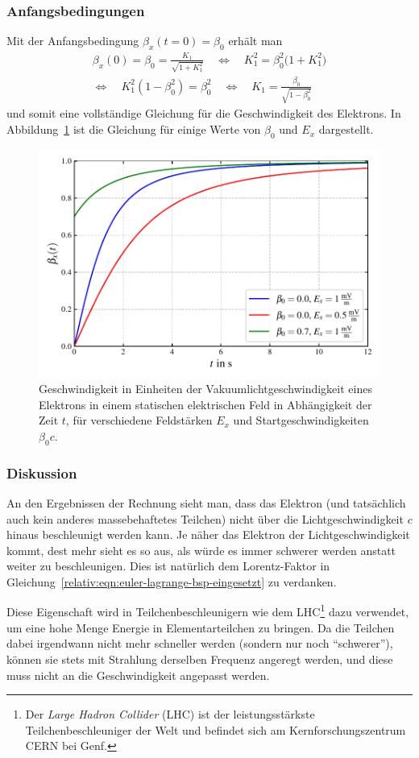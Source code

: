 \subsubsection{Anfangsbedingungen}
Mit der Anfangsbedingung \(\beta_x(t=0)=\beta_0\) erhält man
\begin{multline*}
    \beta_x(0) = \beta_0 = \frac{K_1}{\sqrt{1+K_1^2}}\quad
    \Leftrightarrow\quad K_1^2 = \beta_0^2 \bigl(1+K_1^2\bigr)\\
    \Leftrightarrow\quad K_1^2 (1-\beta_0^2 ) = \beta_0^2 \quad
    \Leftrightarrow\quad K_1 = \frac{\beta_0}{\sqrt{1-\beta_0^2 }}
\end{multline*}
und somit eine vollständige Gleichung für die Geschwindigkeit des Elektrons.
In Abbildung~\ref{relativ:fig:elektron-em-feld} ist die Gleichung für einige
Werte von \(\beta_0\) und \(E_x\) dargestellt.
\begin{figure}
    \centering
    \includegraphics[width=0.8\linewidth]{papers/relativ/images/elektron_e-feld.pdf}
    \caption{Geschwindigkeit in Einheiten der Vakuumlichtgeschwindigkeit
    eines Elektrons in einem statischen elektrischen Feld in Abhängigkeit der Zeit \(t\),
    für verschiedene Feldstärken \(E_x\) und Startgeschwindigkeiten \(\beta_0 c\).
    \label{relativ:fig:elektron-em-feld}}
\end{figure}

\subsubsection{Diskussion}
An den Ergebnissen der Rechnung sieht man, dass das Elektron (und tatsächlich auch kein anderes
massebehaftetes Teilchen) nicht über die Lichtgeschwindigkeit \(c\) hinaus beschleunigt werden kann.
Je näher das Elektron der Lichtgeschwindigkeit kommt, dest mehr sieht es so aus,
als würde es immer schwerer werden anstatt weiter zu beschleunigen.
Dies ist natürlich dem Lorentz-Faktor in Gleichung~\eqref{relativ:eqn:euler-lagrange-bsp-eingesetzt}
zu verdanken.

Diese Eigenschaft wird in Teilchenbeschleunigern wie dem LHC\footnote{
Der \emph{Large Hadron Collider} (LHC) ist der leistungsstärkste
Teilchenbeschleuniger der Welt und befindet sich am
Kernforschungszentrum CERN bei Genf.
}
dazu verwendet, um eine hohe Menge Energie in Elementarteilchen zu bringen.
Da die Teilchen dabei irgendwann nicht mehr schneller werden
(sondern nur noch ``schwerer''),
können sie stets mit Strahlung derselben Frequenz angeregt werden, und
diese muss nicht an die Geschwindigkeit angepasst werden.
